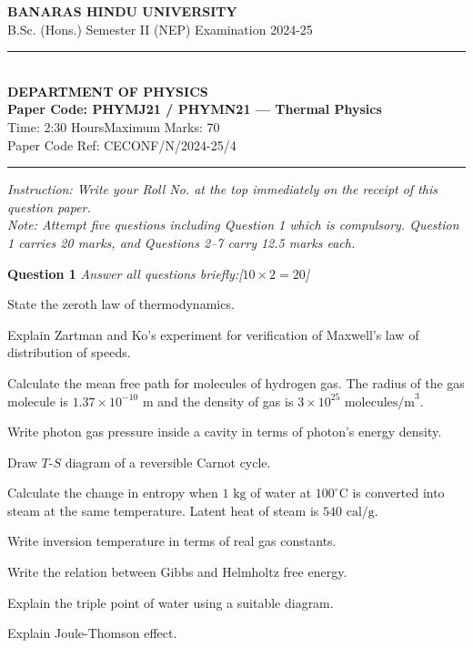 \documentclass[11pt,a4paper]{article}
\newcommand{\pts}[1]{\hfill   \textit{[#1]}}
\begin{document}
\begin{center}
  {\large\bfseries BANARAS HINDU UNIVERSITY}\\[2pt]
  {\normalsize B.Sc. (Hons.) Semester II (NEP) Examination 2024-25}\\[6pt]
  \rule{0.8\linewidth}{0.5pt}\\[6pt]
  {\large\bfseries DEPARTMENT OF PHYSICS}\\[4pt]
  {\large\bfseries Paper Code: PHYMJ21 / PHYMN21 --- Thermal Physics}\\[4pt]
  {\normalsize Time: 2:30 Hours\hfill Maximum Marks: 70}\\[2pt]
  {\small Paper Code Ref: CECONF/N/2024-25/4}
\end{center}

\rule{\linewidth}{0.4pt}\smallskip



\noindent   \textit{Instruction: Write your Roll No. at the top immediately on the receipt of this question paper.}\\[2pt]



\noindent   \textit{Note: Attempt five questions including Question 1 which is compulsory. Question 1 carries 20 marks, and Questions 2--7 carry 12.5 marks each.}
\bigskip




\noindent   \textbf{Question 1}   \textit{Answer all questions briefly:}\pts{$10  \times 2 = 20$}

\begin{parts}
  \item State the zeroth law of thermodynamics.
  \item Explain Zartman and Ko's experiment for verification of Maxwell's law of distribution of speeds.
  \item Calculate the mean free path for molecules of hydrogen gas. The radius of the gas molecule is $1.37  \times 10^{-10} \text{ m}$ and the density of gas is $3  \times 10^{25} \text{ molecules/m}^3$.
  \item Write photon gas pressure inside a cavity in terms of photon's energy density.
  \item Draw $T$-$S$ diagram of a reversible Carnot cycle.
  \item Calculate the change in entropy when $1 \text{ kg}$ of water at $100^\circ \text{C}$ is converted into steam at the same temperature. Latent heat of steam is $540 \text{ cal/g}$.
  \item Write inversion temperature in terms of real gas constants.
  \item Write the relation between Gibbs and Helmholtz free energy.
  \item Explain the triple point of water using a suitable diagram.
  \item Explain Joule-Thomson effect.
\end{parts}
\end{document}
